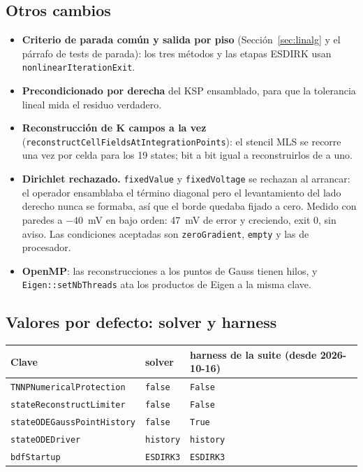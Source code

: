 \documentclass[11pt,a4paper]{article}
\newcommand{\code}[1]{\texttt{\small #1}}
\begin{document}
\subsection{Otros cambios}

\begin{itemize}
  \item \textbf{Criterio de parada común y salida por piso}
        (Sección~\ref{sec:linalg} y el párrafo de tests de parada): los tres
        métodos y las etapas ESDIRK usan \code{nonlinearIterationExit}.
  \item \textbf{Precondicionado por derecha} del KSP ensamblado, para que la
        tolerancia lineal mida el residuo verdadero.
  \item \textbf{Reconstrucción de K campos a la vez}
        (\code{reconstructCellFieldsAtIntegrationPoints}): el stencil MLS se
        recorre una vez por celda para los 19 states; bit a bit igual a
        reconstruirlos de a uno.
  \item \textbf{Dirichlet rechazado.} \code{fixedValue} y \code{fixedVoltage}
        se rechazan al arrancar: el operador ensamblaba el término diagonal pero
        el levantamiento del lado derecho nunca se formaba, así que el borde
        quedaba fijado a cero. Medido con paredes a $-40$~mV en bajo orden:
        47~mV de error y creciendo, exit 0, sin aviso. Las condiciones aceptadas
        son \code{zeroGradient}, \code{empty} y las de procesador.
  \item \textbf{OpenMP}: las reconstrucciones a los puntos de Gauss tienen hilos,
        y \code{Eigen::setNbThreads} ata los productos de Eigen a la misma clave.
\end{itemize}

\subsection{Valores por defecto: solver y harness}

\begin{center}
\begin{tabular}{@{}lll@{}}
\toprule
Clave & solver & harness de la suite (desde 2026-10-16) \\
\midrule
\code{TNNPNumericalProtection} & \code{false} & \code{False} \\
\code{stateReconstructLimiter} & \code{false} & \code{False} \\
\code{stateODEGaussPointHistory} & \code{false} & \code{True} \\
\code{stateODEDriver} & \code{history} & \code{history} \\
\code{bdfStartup} & \code{ESDIRK3} & \code{ESDIRK3} \\
\bottomrule
\end{tabular}
\end{center}
\end{document}
